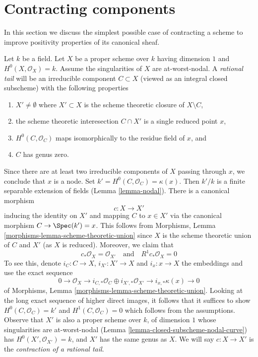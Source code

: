 \section{Contracting components}
\label{section-contracting}

\noindent
In this section we discuss the simplest possible case of contracting
a scheme to improve positivity properties of its canonical sheaf.

\begin{example}
\label{example-rational-tail}
Let $k$ be a field. Let $X$ be a proper scheme over $k$ having dimension $1$
and $H^0(X, \mathcal{O}_X) = k$. Assume the singularities of $X$ are
at-worst-nodal.
A {\it rational tail} will be an irreducible component $C \subset X$
(viewed as an integral closed subscheme) with the following properties
\begin{enumerate}
\item $X' \not = \emptyset$ where $X' \subset X$ is the scheme theoretic closure
of $X \setminus C$,
\item the scheme theoretic interesection $C \cap X'$ is a single
reduced point $x$,
\item $H^0(C, \mathcal{O}_C)$ maps isomorphically to the
residue field of $x$, and
\item $C$ has genus zero.
\end{enumerate}
Since there are at least two irreducible components of $X$ passing through
$x$, we conclude that $x$ is a node.
Set $k' = H^0(C, \mathcal{O}_C) = \kappa(x)$.
Then $k'/k$ is a finite separable extension of fields
(Lemma \ref{lemma-nodal}). There is a canonical morphism
$$
c : X \longrightarrow X'
$$
inducing the identity on $X'$ and mapping $C$ to $x \in X'$
via the canonical morphism $C \to \Spec(k') = x$. This follows from
Morphisms, Lemma \ref{morphisms-lemma-scheme-theoretic-union}
since $X$ is the scheme theoretic union of $C$ and $X'$ (as $X$ is reduced).
Moreover, we claim that
$$
c_*\mathcal{O}_X = \mathcal{O}_{X'}
\quad\text{and}\quad
R^1c_*\mathcal{O}_X = 0
$$
To see this, denote $i_C : C \to X$, $i_{X'} : X' \to X$ and $i_x : x \to X$
the embeddings and use the exact sequence
$$
0 \to \mathcal{O}_X \to
i_{C, *}\mathcal{O}_C \oplus i_{X', *}\mathcal{O}_{X'} \to
i_{x, *}\kappa(x) \to 0
$$
of Morphisms, Lemma \ref{morphisms-lemma-scheme-theoretic-union}.
Looking at the long exact sequence of higher direct images,
it follows that it suffices to show $H^0(C, \mathcal{O}_C) = k'$
and $H^1(C, \mathcal{O}_C) = 0$ which follows from the assumptions.
Observe that $X'$ is also a proper scheme over $k$, of dimension $1$
whose singularities are at-worst-nodal
(Lemma \ref{lemma-closed-subscheme-nodal-curve})
has $H^0(X', \mathcal{O}_{X'}) = k$, and
$X'$ has the same genus as $X$.
We will say $c : X \to X'$ is the
{\it contraction of a rational tail}.
\end{example}


